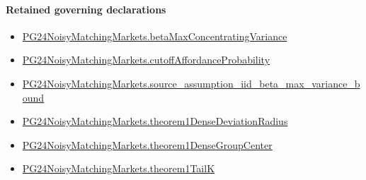\documentclass[10pt]{article}
\begin{document}
\paragraph{Retained governing declarations}
\begin{itemize}\raggedright
\item \hyperlink{governing-declaration-322e8322d17fd70c}{PG24\allowbreak{}Noisy\allowbreak{}Matching\allowbreak{}Markets.\allowbreak{}beta\allowbreak{}Max\allowbreak{}Concentrating\allowbreak{}Variance}
\item \hyperlink{governing-declaration-a4a2a08d89f647e4}{PG24\allowbreak{}Noisy\allowbreak{}Matching\allowbreak{}Markets.\allowbreak{}cutoff\allowbreak{}Affordance\allowbreak{}Probability}
\item \hyperlink{governing-declaration-106a735d10bd3342}{PG24\allowbreak{}Noisy\allowbreak{}Matching\allowbreak{}Markets.\allowbreak{}source\_\allowbreak{}assumption\_\allowbreak{}iid\_\allowbreak{}beta\_\allowbreak{}max\_\allowbreak{}variance\_\allowbreak{}bound}
\item \hyperlink{governing-declaration-2bd27a17fcef3b94}{PG24\allowbreak{}Noisy\allowbreak{}Matching\allowbreak{}Markets.\allowbreak{}theorem1\allowbreak{}Dense\allowbreak{}Deviation\allowbreak{}Radius}
\item \hyperlink{governing-declaration-3d82e494d5b1dcdc}{PG24\allowbreak{}Noisy\allowbreak{}Matching\allowbreak{}Markets.\allowbreak{}theorem1\allowbreak{}Dense\allowbreak{}Group\allowbreak{}Center}
\item \hyperlink{governing-declaration-293a20a9c7b67aee}{PG24\allowbreak{}Noisy\allowbreak{}Matching\allowbreak{}Markets.\allowbreak{}theorem1\allowbreak{}Tail\allowbreak{}K}
\end{itemize}
\end{document}

